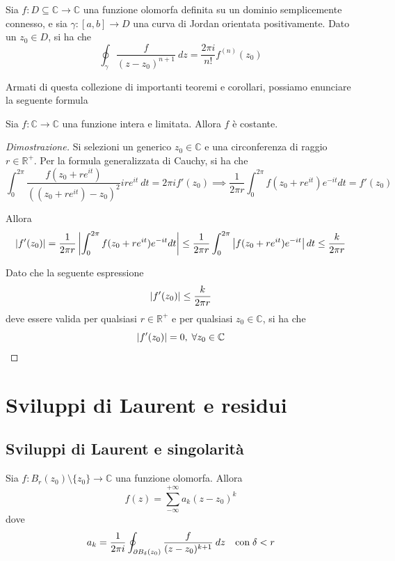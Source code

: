         \begin{definition}
            Sia $f: D \subseteq \mathbb{C} \rightarrow \mathbb{C}$ una funzione olomorfa definita su un dominio semplicemente connesso, e sia $\gamma: [a, b] \rightarrow D$ una curva di Jordan orientata positivamente.
            Dato un $z_{0} \in D$, si ha che
            \[
                \oint_{\gamma} \frac{f}{(z - z_{0})^{n + 1}} \: dz = \frac{2 \pi i}{n!} f^{(n)}(z_{0})
            \]
        \end{definition}

        Armati di questa collezione di importanti teoremi e corollari, possiamo enunciare la seguente formula

        \begin{theorem}
            Sia $f: \mathbb{C} \rightarrow \mathbb{C}$ una funzione intera e limitata.
            Allora $f$ è costante.
        \end{theorem}

        \begin{proof}[Dimostrazione]
            Si selezioni un generico $z_{0} \in \mathbb{C}$ e una circonferenza di raggio $r \in \mathbb{R}^{+}$. Per la formula generalizzata di Cauchy, si ha che
            \[
                \int_{0}^{2\pi} \frac{f(z_{0} + re^{it})}{((z_{0} + re^{it}) - z_{0})^{2}} ire^{it} \: dt = 2 \pi i f'(z_{0}) \implies \frac{1}{2 \pi r} \int_{0}^{2 \pi} f(z_{0} + re^{it}) e^{-it} dt = f'(z_{0})
            \]

            Allora
            \[
                \left\lvert f'(z_{0}) \right\rvert = \frac{1}{2 \pi r} \left\lvert \int_{0}^{2 \pi} f(z_{0} + re^{it}) e^{-it} dt \right\rvert \leq \frac{1}{2 \pi r} \int_{0}^{2 \pi} \left\lvert f(z_{0} + re^{it}) e^{-it} \right\rvert dt \leq \frac{k}{2 \pi r}
            \]

            Dato che la seguente espressione
            \[
                \left\lvert f'(z_{0}) \right\rvert \leq \frac{k}{2 \pi r}
            \]
            deve essere valida per qualsiasi $r \in \mathbb{R}^{+}$ e per qualsiasi $z_{0} \in \mathbb{C}$, si ha che
            \[
                \left\lvert f'(z_{0}) \right\rvert = 0, \; \forall z_{0} \in \mathbb{C}
            \]
        \end{proof}

\section{Sviluppi di Laurent e residui}
    \subsection{Sviluppi di Laurent e singolarità}
            \begin{theorem}
                Sia $f: B_{r}(z_{0}) \setminus \{z_{0}\} \rightarrow \mathbb{C}$ una funzione olomorfa.
                Allora
                \[
                    f(z) = \sum_{-\infty}^{+\infty} a_{k} (z - z_{0})^{k}
                \]
                dove
                \[
                    a_{k} = \frac{1}{2 \pi i} \oint_{\partial B_{\delta}(z_{0})} \frac{f}{(z - z_{0})^{k + 1}} \: dz \quad \textnormal{con} \; \delta < r
                \]
            \end{theorem}

